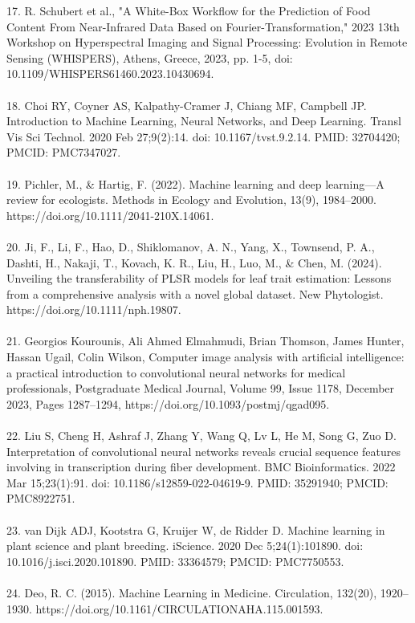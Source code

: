 \documentclass[12pt,a4paper]{report}
\begin{document}
17. R. Schubert et al., "A White-Box Workflow for the Prediction of Food Content From Near-Infrared Data Based on Fourier-Transformation," 2023 13th Workshop on Hyperspectral Imaging and Signal Processing: Evolution in Remote Sensing (WHISPERS), Athens, Greece, 2023, pp. 1-5, doi: 10.1109/WHISPERS61460.2023.10430694. \\
\\
18. Choi RY, Coyner AS, Kalpathy-Cramer J, Chiang MF, Campbell JP. Introduction to Machine Learning, Neural Networks, and Deep Learning. Transl Vis Sci Technol. 2020 Feb 27;9(2):14. doi: 10.1167/tvst.9.2.14. PMID: 32704420; PMCID: PMC7347027.\\
\\
19. Pichler, M., \& Hartig, F. (2022). Machine learning and deep learning—A review for ecologists. Methods in Ecology and Evolution, 13(9), 1984–2000. https://doi.org/10.1111/2041-210X.14061. \\
\\
20. Ji, F., Li, F., Hao, D., Shiklomanov, A. N., Yang, X., Townsend, P. A., Dashti, H., Nakaji, T., Kovach, K. R., Liu, H., Luo, M., \& Chen, M. (2024). Unveiling the transferability of PLSR models for leaf trait estimation: Lessons from a comprehensive analysis with a novel global dataset. New Phytologist. https://doi.org/10.1111/nph.19807. \\
\\
21. Georgios Kourounis, Ali Ahmed Elmahmudi, Brian Thomson, James Hunter, Hassan Ugail, Colin Wilson, Computer image analysis with artificial intelligence: a practical introduction to convolutional neural networks for medical professionals, Postgraduate Medical Journal, Volume 99, Issue 1178, December 2023, Pages 1287–1294, https://doi.org/10.1093/postmj/qgad095. \\
\\
22. Liu S, Cheng H, Ashraf J, Zhang Y, Wang Q, Lv L, He M, Song G, Zuo D. Interpretation of convolutional neural networks reveals crucial sequence features involving in transcription during fiber development. BMC Bioinformatics. 2022 Mar 15;23(1):91. doi: 10.1186/s12859-022-04619-9. PMID: 35291940; PMCID: PMC8922751. \\
\\
23. van Dijk ADJ, Kootstra G, Kruijer W, de Ridder D. Machine learning in plant science and plant breeding. iScience. 2020 Dec 5;24(1):101890. doi: 10.1016/j.isci.2020.101890. PMID: 33364579; PMCID: PMC7750553. \\
\\
24. Deo, R. C. (2015). Machine Learning in Medicine. Circulation, 132(20), 1920–1930. https://doi.org/10.1161/CIRCULATIONAHA.115.001593. \\
\end{document}
